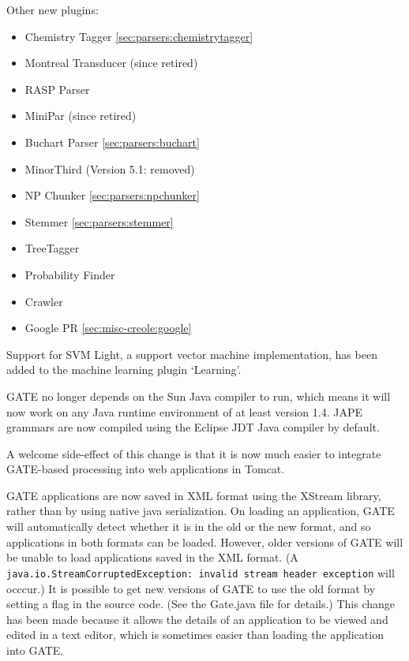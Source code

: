 Other new plugins:
\begin{itemize}
\item Chemistry Tagger \ref{sec:parsers:chemistrytagger}
\item Montreal Transducer (since retired)
\item RASP Parser
\item MiniPar (since retired)
\item Buchart Parser \ref{sec:parsers:buchart}
\item MinorThird (Version 5.1: removed)
\item NP Chunker \ref{sec:parsers:npchunker}
\item Stemmer \ref{sec:parsers:stemmer}
\item TreeTagger %
\item Probability Finder %
\item Crawler %
\item Google PR \ref{sec:misc-creole:google}
\end{itemize}

Support for SVM Light, a support vector machine implementation, has been added
to the machine learning plugin `Learning'.



GATE no longer depends on the Sun Java compiler to run, which means it will now
work on any Java runtime environment of at least version 1.4.  JAPE grammars
are now compiled using the Eclipse JDT Java compiler by default.

A welcome side-effect of this change is that it is now much easier to integrate
GATE-based processing into web applications in Tomcat.


GATE applications are now saved in XML format using the XStream library,
rather than by using native java
serialization. On loading an application, GATE
will automatically detect whether it is in the old or the new format, and so
applications in both formats can be loaded. However, older
versions of GATE will be unable to load applications saved in the XML format. (A
{\tt java.io.StreamCorruptedException: invalid stream header exception} will
occcur.) It is possible to get new versions of GATE to use the old format by
setting a flag in the source code. (See the Gate.java file for details.) This
change has been made because it allows the details of an application to be
viewed and edited in a text editor, which is sometimes easier than loading the
application into GATE.

